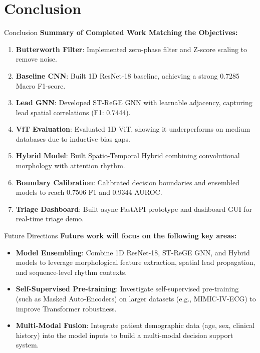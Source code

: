 \documentclass[11pt,aspectratio=169]{beamer}
\begin{document}
\section{Conclusion}
\begin{frame}{Conclusion}
    \textbf{Summary of Completed Work Matching the Objectives:}
    \begin{enumerate}
        \item \textbf{Butterworth Filter}: Implemented zero-phase filter and Z-score scaling to remove noise.
        \item \textbf{Baseline CNN}: Built 1D ResNet-18 baseline, achieving a strong 0.7285 Macro F1-score.
        \item \textbf{Lead GNN}: Developed ST-ReGE GNN with learnable adjacency, capturing lead spatial correlations (F1: 0.7444).
        \item \textbf{ViT Evaluation}: Evaluated 1D ViT, showing it underperforms on medium databases due to inductive bias gaps.
        \item \textbf{Hybrid Model}: Built Spatio-Temporal Hybrid combining convolutional morphology with attention rhythm.
        \item \textbf{Boundary Calibration}: Calibrated decision boundaries and ensembled models to reach 0.7506 F1 and 0.9344 AUROC.
        \item \textbf{Triage Dashboard}: Built async FastAPI prototype and dashboard GUI for real-time triage demo.
    \end{enumerate}
\end{frame}

\begin{frame}{Future Directions}
    \textbf{Future work will focus on the following key areas:}
    \begin{itemize}
        \item \textbf{Model Ensembling}: Combine 1D ResNet-18, ST-ReGE GNN, and Hybrid models to leverage morphological feature extraction, spatial lead propagation, and sequence-level rhythm contexts.
        \item \textbf{Self-Supervised Pre-training}: Investigate self-supervised pre-training (such as Masked Auto-Encoders) on larger datasets (e.g., MIMIC-IV-ECG) to improve Transformer robustness.
        \item \textbf{Multi-Modal Fusion}: Integrate patient demographic data (age, sex, clinical history) into the model inputs to build a multi-modal decision support system.
    \end{itemize}
\end{frame}
\end{document}
